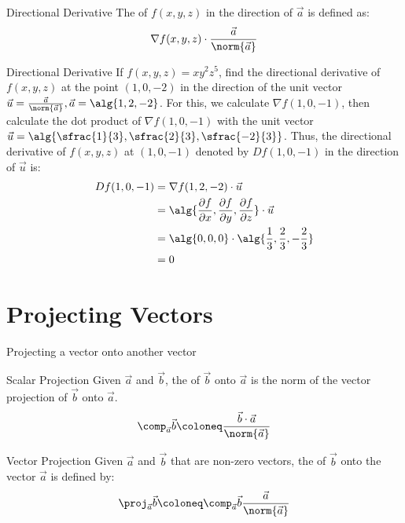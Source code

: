 \begin{dfnbox}{Directional Derivative}{}
    The  of $f(x,y,z)$ in the direction of $\vec{a}$ is defined as:
    \[ \nabla f(x,y,z) \cdot \frac{\vec{a}}{\norm{\vec{a}}} \]
\end{dfnbox}

\begin{exbox}{Directional Derivative}{}
    If $f(x,y,z) = xy^2z^5$, find the directional derivative of $f(x,y,z)$ at the point $(1,0,-2)$ in the direction of the unit vector $\vec{u} = \frac{\vec{a}}{\norm{\vec{a}}}, \vec{a} = \alg{1,2,-2}$.
    \tcblower
    For this, we calculate $\nabla f(1,0,-1)$, then calculate the dot product of $\nabla f(1,0,-1)$ with the unit vector $\vec{u} = \alg{\sfrac{1}{3}, \sfrac{2}{3}, \sfrac{-2}{3}}$. Thus, the directional derivative of $f(x,y,z)$ at $(1,0,-1)$ denoted by $Df(1,0,-1)$ in the direction of $\vec{u}$ is:
    \begin{align*}
        Df(1,0,-1)
        &= \nabla f(1,2,-2) \cdot \vec{u} \\
        &= \alg{\frac{\partial f}{\partial x}, \frac{\partial f}{\partial y}, \frac{\partial f}{\partial z}} \cdot \vec{u} \\
        &= \alg{0,0,0} \cdot \alg{\frac13, \frac23, -\frac23} \\
        &= 0
    \end{align*}
\end{exbox}

\section{Projecting Vectors}
\newcommand{\vectorproj}[2][]{\textit{proj}_{\vect{#1}}\vect{#2}}

Projecting a vector onto another vector

\begin{dfnbox}{Scalar Projection}{}
    Given $\vec{a}$ and $\vec{b}$, the  of $\vec{b}$ onto $\vec{a}$ is the norm of the vector projection of $\vec{b}$ onto $\vec{a}$.
    \tcblower
    \[ \comp_{\vec{a}} \vec{b} \coloneq \frac{\vec{b} \cdot \vec{a}}{\norm{\vec{a}}} \]
\end{dfnbox}

\begin{dfnbox}{Vector Projection}{}
    Given $\vec{a}$ and $\vec{b}$ that are non-zero vectors, the  of $\vec{b}$ onto the vector $\vec{a}$ is defined by:
    \[ \proj_{\vec{a}} \vec{b} \coloneq \comp_{\vec{a}} \vec{b} \frac{\vec{a}}{\norm{\vec{a}}} \]
\end{dfnbox}

